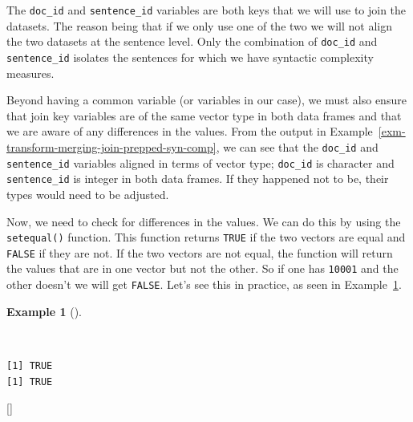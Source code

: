 \documentclass[
  letterpaper,
  krantz1]{latex/krantz-mod}
\newenvironment{Shaded}{\begin{snugshade}}{\end{snugshade}}
\newcommand{\CommentTok}[1]{\textcolor[rgb]{0.00,0.00,0.00}{\textit{#1}}}
\newcommand{\FunctionTok}[1]{\textcolor[rgb]{0.00,0.00,0.00}{#1}}
\newcommand{\NormalTok}[1]{\textcolor[rgb]{0.00,0.00,0.00}{#1}}
\newcommand{\SpecialCharTok}[1]{\textcolor[rgb]{0.00,0.00,0.00}{#1}}
\newcommand{\cindex}[1]{%
  \StrSubstitute{#1}{_}{\_}[\temp]%
  \index{\temp}%
}
\theoremstyle{definition}
\theoremstyle{definition}
\newtheorem{example}{Example}[chapter]
\theoremstyle{remark}
\begin{document}
The \texttt{doc\_id} and \texttt{sentence\_id} variables are both keys
that we will use to join the datasets. The reason being that if we only
use one of the two we will not align the two datasets at the sentence
level. Only the combination of \texttt{doc\_id} and
\texttt{sentence\_id} isolates the sentences for which we have syntactic
complexity measures.

Beyond having a common variable (or variables in our case), we must also
ensure that join key variables are of the same vector
type in both data frames and that we are aware of
any differences in the values. From the output in
Example~\ref{exm-transform-merging-join-prepped-syn-comp}, we can see
that the \texttt{doc\_id} and \texttt{sentence\_id} variables aligned in
terms of vector type; \texttt{doc\_id} is character and
\texttt{sentence\_id} is integer in both data frames. If they happened
not to be, their types would need to be adjusted.

Now, we need to check for differences in the values. We can do this by
using the \texttt{setequal()} function. This function returns
\texttt{TRUE} if the two vectors are equal and \texttt{FALSE} if they
are not. If the two vectors are not equal, the function will return the
values that are in one vector but not the other. So if one has
\texttt{10001} and the other doesn't we will get \texttt{FALSE}. Let's
see this in practice, as seen in
Example~\ref{exm-transform-merging-join-prepped-syn-comp-check}.

\begin{example}[]\protect\hypertarget{exm-transform-merging-join-prepped-syn-comp-check}{}\label{exm-transform-merging-join-prepped-syn-comp-check}

~

\begin{Shaded}
\end{Shaded}

\begin{verbatim}
[1] TRUE
[1] TRUE
\end{verbatim}

\cindex{setequal()}

\end{example}
\end{document}
